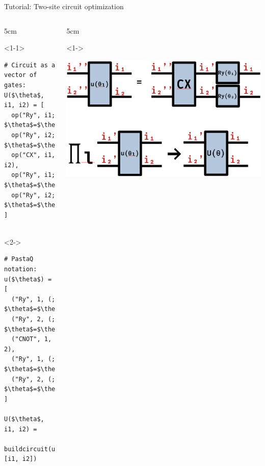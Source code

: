 \begin{frame}[fragile]{Tutorial: Two-site circuit optimization}

\begin{columns}

\begin{column}{5cm}

\begin{onlyenv}<1-1>
\begin{lstlisting}[language=JuliaLocal, style=julia, mathescape, basicstyle=\small]
# Circuit as a vector of gates:
U($\theta$, i1, i2) = [
  op("Ry", i1; $\theta$=$\theta$[1]),
  op("Ry", i2; $\theta$=$\theta$[2]),
  op("CX", i1, i2),
  op("Ry", i1; $\theta$=$\theta$[3]),
  op("Ry", i2; $\theta$=$\theta$[4]),
]


 \end{lstlisting}
\end{onlyenv}

\begin{onlyenv}<2->
\begin{lstlisting}[language=JuliaLocal, style=julia, mathescape, basicstyle=\small]
# PastaQ notation:
u($\theta$) = [
  ("Ry", 1, (; $\theta$=$\theta$[1])),
  ("Ry", 2, (; $\theta$=$\theta$[2])),
  ("CNOT", 1, 2),
  ("Ry", 1, (; $\theta$=$\theta$[3])),
  ("Ry", 2, (; $\theta$=$\theta$[4])),
]

U($\theta$, i1, i2) =
  buildcircuit(u($\theta$), [i1, i2])
\end{lstlisting}
\end{onlyenv}

\end{column}

\begin{column}{5cm}

\begin{onlyenv}<1->
\vspace*{0.0cm}
\begin{center}
\includegraphics[width=1.0\textwidth]{
  slides/assets/U12.png
}
\end{center}
\vspace*{0.0cm}
\end{onlyenv}

\end{column}

\end{columns}

\end{frame}
